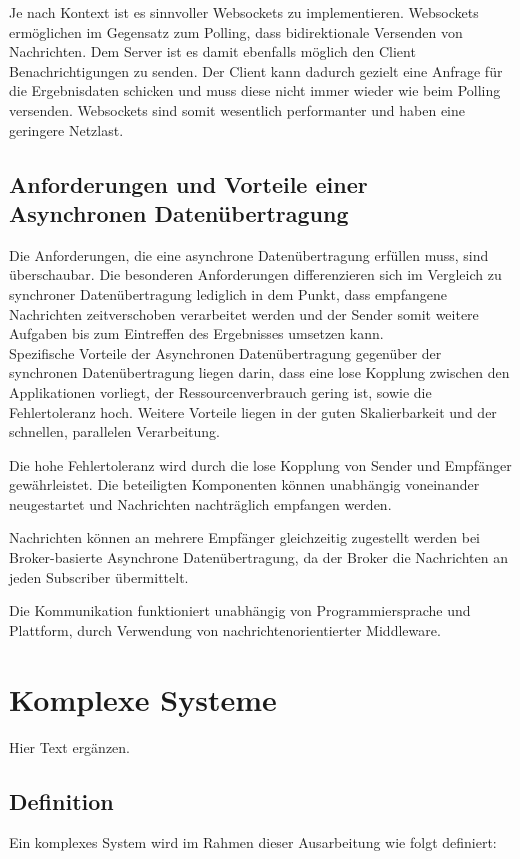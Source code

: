 Je nach Kontext ist es sinnvoller Websockets zu implementieren. Websockets ermöglichen im Gegensatz zum Polling, dass bidirektionale Versenden von Nachrichten. Dem Server ist es damit ebenfalls möglich den Client Benachrichtigungen zu senden. Der Client kann dadurch gezielt eine Anfrage für die Ergebnisdaten schicken und muss diese nicht immer wieder wie beim Polling versenden. Websockets sind somit wesentlich performanter und haben eine geringere Netzlast. \cite*{goll:2020}

\subsection{Anforderungen und Vorteile einer Asynchronen Datenübertragung}
Die Anforderungen, die eine asynchrone Datenübertragung erfüllen muss, sind überschaubar. Die besonderen Anforderungen differenzieren sich im Vergleich zu synchroner Datenübertragung lediglich in dem Punkt, dass empfangene Nachrichten zeitverschoben verarbeitet werden \cite*{tremp:2021} und der Sender somit weitere Aufgaben bis zum Eintreffen des Ergebnisses umsetzen kann.  \\

Spezifische Vorteile der Asynchronen Datenübertragung gegenüber der synchronen Datenübertragung liegen darin, dass eine lose Kopplung zwischen den Applikationen vorliegt, der Ressourcenverbrauch gering ist, sowie die Fehlertoleranz hoch. \cite*{tremp:2021}
Weitere Vorteile liegen in der guten Skalierbarkeit und der schnellen, parallelen Verarbeitung. \cite*{tremp:2021}

Die hohe Fehlertoleranz wird durch die lose Kopplung von Sender und Empfänger gewährleistet. Die beteiligten Komponenten können unabhängig voneinander neugestartet und Nachrichten nachträglich empfangen werden. \cite*{abts:2019}

Nachrichten können an mehrere Empfänger gleichzeitig zugestellt werden bei Broker-basierte Asynchrone Datenübertragung, da der Broker die Nachrichten an jeden Subscriber übermittelt. \cite*{abts:2019}

Die Kommunikation funktioniert unabhängig von Programmiersprache und Plattform, durch Verwendung von nachrichtenorientierter Middleware. \cite{abts:2019} 

\section{Komplexe Systeme}
Hier Text ergänzen.


\subsection{Definition}
Ein komplexes System wird im Rahmen dieser Ausarbeitung wie folgt definiert:

